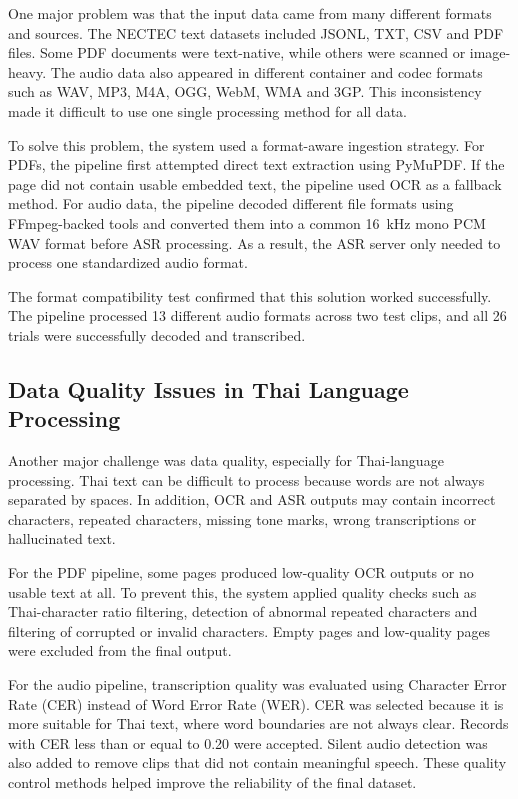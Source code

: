 \documentclass[12pt,oneside,openright,a4paper]{cpe-english-project}
\begin{document}
One major problem was that the input data came from many different formats and sources. The NECTEC text datasets included JSONL, TXT, CSV and PDF files. Some PDF documents were text-native, while others were scanned or image-heavy. The audio data also appeared in different container and codec formats such as WAV, MP3, M4A, OGG, WebM, WMA and 3GP. This inconsistency made it difficult to use one single processing method for all data.

To solve this problem, the system used a format-aware ingestion strategy. For PDFs, the pipeline first attempted direct text extraction using PyMuPDF. If the page did not contain usable embedded text, the pipeline used OCR as a fallback method. For audio data, the pipeline decoded different file formats using FFmpeg-backed tools and converted them into a common 16~kHz mono PCM WAV format before ASR processing. As a result, the ASR server only needed to process one standardized audio format.

The format compatibility test confirmed that this solution worked successfully. The pipeline processed 13 different audio formats across two test clips, and all 26 trials were successfully decoded and transcribed.

\subsection{Data Quality Issues in Thai Language Processing}

Another major challenge was data quality, especially for Thai-language processing. Thai text can be difficult to process because words are not always separated by spaces. In addition, OCR and ASR outputs may contain incorrect characters, repeated characters, missing tone marks, wrong transcriptions or hallucinated text.

For the PDF pipeline, some pages produced low-quality OCR outputs or no usable text at all. To prevent this, the system applied quality checks such as Thai-character ratio filtering, detection of abnormal repeated characters and filtering of corrupted or invalid characters. Empty pages and low-quality pages were excluded from the final output.

For the audio pipeline, transcription quality was evaluated using Character Error Rate (CER) instead of Word Error Rate (WER). CER was selected because it is more suitable for Thai text, where word boundaries are not always clear. Records with CER less than or equal to 0.20 were accepted. Silent audio detection was also added to remove clips that did not contain meaningful speech. These quality control methods helped improve the reliability of the final dataset.
\end{document}
